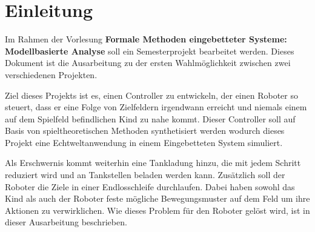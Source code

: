 \section{Einleitung}
Im Rahmen der Vorlesung \textbf{Formale Methoden eingebetteter Systeme: Modellbasierte Analyse} soll ein Semesterprojekt bearbeitet werden. Dieses Dokument ist die Ausarbeitung zu der ersten Wahlmöglichkeit zwischen zwei verschiedenen Projekten.\par

Ziel dieses Projekts ist es, einen Controller zu entwickeln, der einen Roboter so steuert, dass er eine Folge von Zielfeldern irgendwann erreicht und niemals einem auf dem Spielfeld befindlichen Kind zu nahe kommt. Dieser Controller soll auf Basis von spieltheoretischen Methoden synthetisiert werden wodurch dieses Projekt eine Echtweltanwendung in einem Eingebetteten System simuliert.\par

Als Erschwernis kommt weiterhin eine Tankladung hinzu, die mit jedem Schritt reduziert wird und an Tankstellen beladen werden kann. Zusätzlich soll der Roboter die Ziele in einer Endlosschleife durchlaufen. Dabei haben sowohl das Kind als auch der Roboter feste mögliche Bewegungsmuster auf dem Feld um ihre Aktionen zu verwirklichen. Wie dieses Problem für den Roboter gelöst wird, ist in dieser Ausarbeitung beschrieben.



